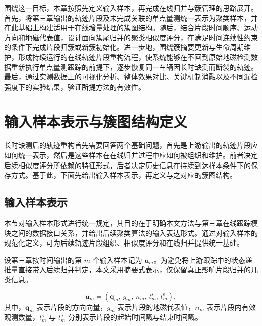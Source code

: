 \documentclass{xdupgthesis}
\begin{document}
围绕这一目标，本章按照先定义输入样本，再完成在线归并与簇管理的思路展开。首先，将第三章输出的轨迹片段及未完成关联的单点量测统一表示为聚类样本，并在此基础上构建适用于在线增量处理的簇图结构。随后，结合片段时间顺序、运动方向和地磁代表值，设计面向簇尾归并的聚类相似度评分，在满足时间连续性约束的条件下完成片段归簇或新簇初始化。进一步地，围绕簇摘要更新与生命周期维护，形成持续运行的在线轨迹片段重构流程，使系统能够在不回到原始地磁检测数据重新执行单点量测跟踪的前提下，逐步恢复同一车辆因长时缺测而断裂的轨迹。最后，通过实测数据上的可视化分析、整体效果对比、关键机制消融以及不同漏检强度下的实验结果，验证所提方法的有效性。



\section{输入样本表示与簇图结构定义}

长时缺测后的轨迹重构首先需要回答两个基础问题，首先是上游输出的轨迹片段应如何统一表示，然后是这些样本在在线归并过程中应如何被组织和维护。前者决定后续相似度评分所依赖的特征形式，后者决定历史信息在持续到达样本条件下的保存方式。基于此，下面先给出输入样本表示，再定义与之对应的簇图结构。

\subsection{输入样本表示}

本节对输入样本形式进行统一规定，其目的在于明确本文方法与第三章在线跟踪模块之间的数据接口关系，并给出后续聚类算法的输入表达形式。通过对输入样本的规范化定义，可为后续轨迹片段组织、相似度评分和在线归并提供统一基础。

设第三章按时间输出的第 $m$ 个输入样本记为 $\mathbf{u}_m$。为避免将上游跟踪中的状态递推量直接带入后续归并判定，本文采用摘要式表示，仅保留真正影响片段归并的几类信息。

\begin{equation}
	\mathbf{u}_m=
	\left(
	\mathbf{q}_m,\,
	g_m,\,
	n_m,\,
	t_m^{\mathrm{s}},\,
	t_m^{\mathrm{e}}
	\right),
\end{equation}
其中，$\mathbf{q}_m$ 表示片段的方向向量，$g_m$ 表示片段的地磁代表值，$n_m$ 表示片段内有效观测数量，$t_m^{\mathrm{s}}$ 与 $t_m^{\mathrm{e}}$ 分别表示片段的起始时间戳与结束时间戳。
\end{document}
